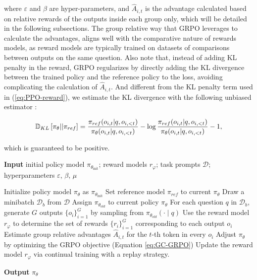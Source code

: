 \begin{itemize}[topsep=0pt]
\begin{itemize}[topsep=0pt]
where $\varepsilon$ and $\beta$ are hyper-parameters, and $\hat{A}_{i,t}$  is the advantage calculated based on relative rewards of the outputs inside each group only, which will be detailed in the following subsections. The group relative way that GRPO leverages to calculate the advantages, aligns well with the comparative nature of rewards models,  as reward models are typically trained on datasets of comparisons between outputs on the same question. Also note that, instead of adding KL penalty in the reward, GRPO regularizes by directly adding the KL divergence between the trained policy and the reference policy to the loss, avoiding complicating the calculation of  $\hat{A}_{i,t}$. And different from the KL penalty term used in (\ref{eq:PPO-reward}), we estimate the KL divergence with the following unbiased estimator \citep{kl_approx}:

\begin{equation}
\small
    \mathbb{D}_{KL}\left[\pi_{\theta} || \pi_{ref}\right] = \frac{\pi_{ref}(o_{i,t}|q,o_{i,<t})}{\pi_{\theta}(o_{i,t}|q,o_{i,<t})} - \log \frac{\pi_{ref}(o_{i,t}|q,o_{i,<t})}{\pi_{\theta}(o_{i,t}|q,o_{i,<t})} - 1,
\end{equation}

which is guaranteed to be positive.

\begin{algorithm}[t]
  \small
  \caption{Iterative Group Relative Policy Optimization}
  \textbf{Input} initial policy model $\pi_{\theta_{\text{init}}}$; reward models $r_\varphi$; task prompts $\mathcal{D}$; 
  hyperparameters $\varepsilon$, $\beta$, $\mu$
  \begin{algorithmic}[1]
    \State Initialize policy model $\pi_\theta$ as $\pi_{\theta_{\text{init}}}$
       \State Set reference model $\pi_{ref}$ to current $\pi_{\theta}$
      \State Draw a minibatch $\mathcal{D}_b$ from $\mathcal{D}$
      \State Assign $\pi_{\theta_{old}}$ to current policy $\pi_{\theta}$
      \State For each question $q$ in $\mathcal{D}_b$, generate $G$ outputs $\{o_i\}_{i=1}^G$ by sampling from $\pi_{\theta_{old}} (\cdot \mid q)$
      \State Use the reward model $r_{\varphi}$ to determine the set of rewards $\{r_i\}_{i=1}^G$ corresponding to each output $o_i$
      \State Estimate group relative advantages $\hat{A}_{i,t}$ for the $t$-th token in every $o_i$
        \State Adjust $\pi_{\theta}$ by optimizing the GRPO objective (Equation \ref{eq:GC-GRPO})
      \EndFor
    \EndFor \State Update the reward model $r_\varphi$ via continual training with a replay strategy.
    \EndFor 
  \end{algorithmic}
  \textbf{Output} $\pi_\theta$
  \label{alg:iter-grpo}
\end{algorithm}


\end{itemize}
\end{itemize}
